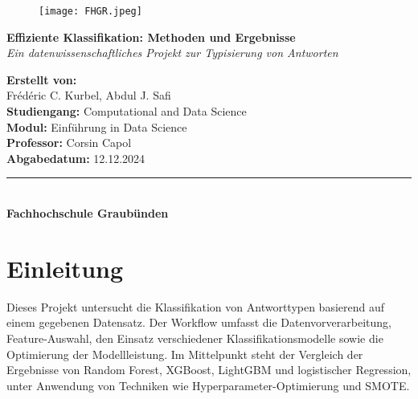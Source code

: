\documentclass[a4paper,12pt]{article}
\begin{document}

\begin{figure}[t]
    \centering
    \texttt{[image: FHGR.jpeg]} %
\end{figure}

\vspace{2cm}

\begin{center}
    {\Huge \textbf{Effiziente Klassifikation: Methoden und Ergebnisse}} \\[1.5em]
    {\Large \textit{Ein datenwissenschaftliches Projekt zur Typisierung von Antworten}} \\
    \vspace{2cm}
    
    \textbf{Erstellt von:} \\[0.5em]
    {\Large Frédéric C. Kurbel, Abdul J. Safi} \\[1.0em]
    
    \textbf{Studiengang:} Computational and Data Science \\[0.5em]
    \textbf{Modul:} Einführung in Data Science \\[0.5em]
    \textbf{Professor:} Corsin Capol \\[2.0em]
    
    \textbf{Abgabedatum:} 12.12.2024
\end{center}

\vfill

\begin{center}
    \rule{0.8\textwidth}{0.5pt} \\[0.5em]
    \textbf{Fachhochschule Graubünden}
\end{center}
\newpage


\renewcommand{\contentsname}{Inhaltsverzeichnis}
\tableofcontents

\newpage
{} %


\section{Einleitung}
Dieses Projekt untersucht die Klassifikation von Antworttypen basierend auf einem gegebenen Datensatz. Der Workflow umfasst die Datenvorverarbeitung, Feature-Auswahl, den Einsatz verschiedener Klassifikationsmodelle sowie die Optimierung der Modellleistung. Im Mittelpunkt steht der Vergleich der Ergebnisse von Random Forest, XGBoost, LightGBM und logistischer Regression, unter Anwendung von Techniken wie Hyperparameter-Optimierung und SMOTE.
\end{document}
